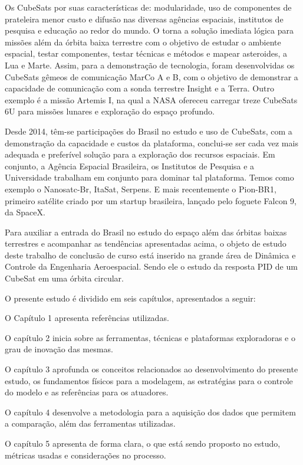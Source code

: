 Os CubeSats por suas características de: modularidade, uso de componentes de prateleira menor custo e difusão nas diversas agências espaciais, institutos de pesquisa e educação ao redor do mundo. O torna a solução imediata lógica para missões além da órbita baixa terrestre com o objetivo de estudar o ambiente espacial, testar componentes, testar técnicas e métodos e mapear asteroides, a Lua e Marte. Assim, para a demonstração de tecnologia, foram desenvolvidas os CubeSats gêmeos de comunicação MarCo A e B, com o objetivo de demonstrar a capacidade de comunicação com a sonda terrestre Insight e a Terra.  Outro exemplo é a missão Artemis I, na qual a NASA ofereceu carregar treze CubeSats 6U para missões lunares e exploração do espaço profundo.

Desde 2014, têm-se participações do Brasil no estudo e uso de CubeSats, com a demonstração da capacidade e custos da plataforma, conclui-se ser cada vez mais adequada e preferível solução para a exploração dos recursos espaciais. Em conjunto, a Agência Espacial Brasileira, os Institutos de Pesquisa e a Universidade trabalham em conjunto para dominar tal plataforma. Temos como exemplo o Nanosatc-Br, ItaSat, Serpens. E mais recentemente o Pion-BR1, primeiro satélite criado por um startup brasileira, lançado pelo foguete Falcon 9, da SpaceX.

Para auxiliar a entrada do Brasil no estudo do espaço além das órbitas baixas terrestres e acompanhar as tendências apresentadas acima, o objeto de estudo deste trabalho de conclusão de curso está inserido na grande área de Dinâmica e Controle da Engenharia Aeroespacial. Sendo ele o estudo da resposta PID de um CubeSat em uma órbita circular.

O presente estudo é dividido em seis capítulos, apresentados a seguir:

O Capítulo 1 apresenta referências utilizadas.

O capítulo 2 inicia sobre as ferramentas, técnicas e plataformas exploradoras e o grau de inovação das mesmas.  

O capítulo 3 aprofunda os conceitos relacionados ao desenvolvimento do presente estudo, os fundamentos físicos para a modelagem, as estratégias para o controle do modelo e as referências para os atuadores.

O capítulo 4 desenvolve a metodologia para a aquisição dos dados que permitem a comparação, além das ferramentas utilizadas.

O capítulo 5 apresenta de forma clara, o que está sendo proposto no estudo, métricas usadas e considerações no processo.

